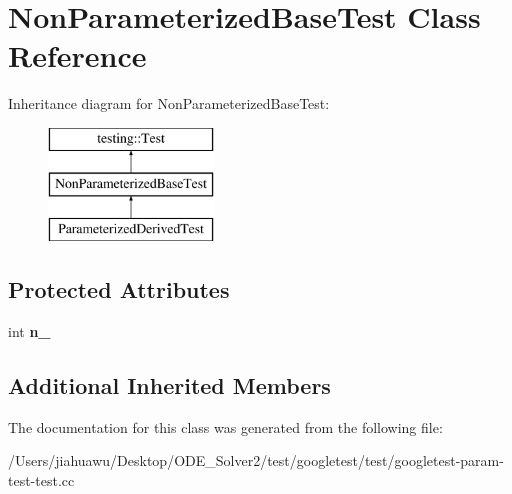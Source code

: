 \hypertarget{class_non_parameterized_base_test}{}\section{Non\+Parameterized\+Base\+Test Class Reference}
\label{class_non_parameterized_base_test}
Inheritance diagram for Non\+Parameterized\+Base\+Test\+:\begin{figure}[H]
\begin{center}
\leavevmode
\includegraphics[height=3.000000cm]{class_non_parameterized_base_test}
\end{center}
\end{figure}
\subsection*{Protected Attributes}
\begin{DoxyCompactItemize}
\item 
\mbox{\label{class_non_parameterized_base_test_a617d4bbfd2aa5f6d41eea3089f7ad039}} 
int {\bfseries n\+\_\+}
\end{DoxyCompactItemize}
\subsection*{Additional Inherited Members}


The documentation for this class was generated from the following file\+:\begin{DoxyCompactItemize}
\item 
/\+Users/jiahuawu/\+Desktop/\+O\+D\+E\+\_\+\+Solver2/test/googletest/test/googletest-\/param-\/test-\/test.\+cc\end{DoxyCompactItemize}
